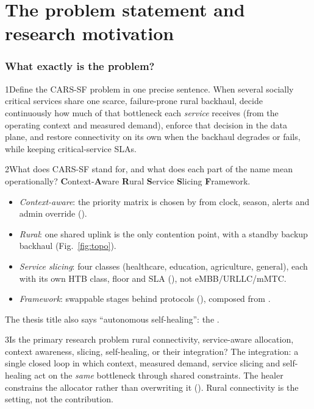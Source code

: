 \part{The problem statement and research motivation}

\section{What exactly is the problem?}

\begin{qa}{1}{Define the CARS-SF problem in one precise sentence.}
When several socially critical services share one scarce, failure-prone rural backhaul, decide continuously how
much of that bottleneck each \emph{service} receives (from the operating context and measured demand), enforce
that decision in the data plane, and restore connectivity on its own when the backhaul degrades or fails, while
keeping critical-service SLAs.
\end{qa}

\begin{qa}{2}{What does CARS-SF stand for, and what does each part of the name mean operationally?}
\textbf{C}ontext-\textbf{A}ware \textbf{R}ural \textbf{S}ervice \textbf{S}licing \textbf{F}ramework.
\begin{itemize}
\item \emph{Context-aware}: the priority matrix is chosen by  from clock, season, alerts
and admin override ().
\item \emph{Rural}: one shared uplink is the only contention point, with a standby backup backhaul (Fig.~\ref{fig:topo}).
\item \emph{Service slicing}: four classes (healthcare, education, agriculture, general), each with its own HTB class,
floor and SLA (), not eMBB/URLLC/mMTC.
\item \emph{Framework}: swappable stages behind protocols (), composed from
.
\end{itemize}
The thesis title also says ``autonomous self-healing'': the .
\end{qa}

\begin{qa}{3}{Is the primary research problem rural connectivity, service-aware allocation, context awareness, slicing, self-healing, or their integration?}
The integration: a single closed loop in which context, measured demand, service slicing and self-healing act on
the \emph{same} bottleneck through shared constraints. The healer constrains the allocator rather than overwriting it
(). Rural connectivity is the setting, not the contribution.
\end{qa}

